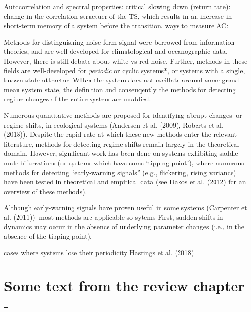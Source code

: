 \documentclass[12pt,twoside,openany]{reedthesis}
\begin{document}
Autocorrelation and spectral properties: critical slowing down (return
rate): change in the correlation structuer of the TS, which results in
an increase in short-term memory of a system before the transition. ways
to measure AC:

Methods for distinguishing noise form signal were borrowed from
information theories, and are well-developed for climatological and
oceanographic data. However, there is still debate about white vs red
noise. Further, methods in these fields are well-developed for
\emph{periodic} or cyclic systems*, or systems with a single, known
state attractor. WHen the system does not oscillate around some grand
mean system state, the definition and conseuqently the methods for
detecting regime changes of the entire system are muddied.

Numerous quantitative methods are proposed for identifying abrupt
changes, or regime shifts, in ecological systems (Andersen et al.
(2009), Roberts et al. (2018)). Despite the rapid rate at which these
new methods enter the relevant literature, methods for detecting regime
shifts remain largely in the theoretical domain. However, significant
work has been done on systems exhibiting saddle-node bifurcations (or
systems which have some `tipping point'), where numerous methods for
detecting ``early-warning signals'' (e.g., flickering, rising variance)
have been tested in theoretical and empirical data (see Dakos et al.
(2012) for an overview of these methods).

Although early-warning signals have proven useful in some systems
(Carpenter et al. (2011)), most methods are applicable so sytems First,
sudden shifts in dynamics may occur in the absence of underlying
parameter changes (i.e., in the absence of the tipping point).

cases where systems lose their periodicity Hastings et al. (2018)

\section{Some text from the review chapter
-}\label{some-text-from-the-review-chapter--}
\end{document}
